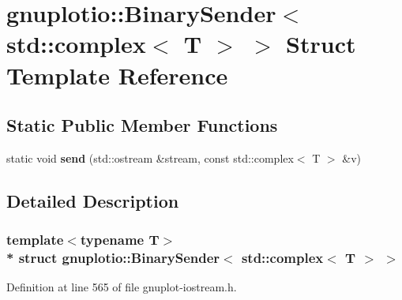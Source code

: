 \hypertarget{structgnuplotio_1_1_binary_sender_3_01std_1_1complex_3_01_t_01_4_01_4}{}\section{gnuplotio\+:\+:Binary\+Sender$<$ std\+:\+:complex$<$ T $>$ $>$ Struct Template Reference}
\label{structgnuplotio_1_1_binary_sender_3_01std_1_1complex_3_01_t_01_4_01_4}
\subsection*{Static Public Member Functions}
\begin{DoxyCompactItemize}
\item 
static void {\bfseries send} (std\+::ostream \&stream, const std\+::complex$<$ T $>$ \&v)\hypertarget{structgnuplotio_1_1_binary_sender_3_01std_1_1complex_3_01_t_01_4_01_4_a759de700a1cd68000830a4b15a6fec49}{}\label{structgnuplotio_1_1_binary_sender_3_01std_1_1complex_3_01_t_01_4_01_4_a759de700a1cd68000830a4b15a6fec49}

\end{DoxyCompactItemize}


\subsection{Detailed Description}
\subsubsection*{template$<$typename T$>$\\*
struct gnuplotio\+::\+Binary\+Sender$<$ std\+::complex$<$ T $>$ $>$}



Definition at line 565 of file gnuplot-\/iostream.\+h.

